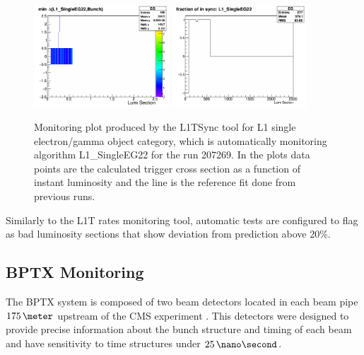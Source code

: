 \begin{figure}[!htb]
\centering
\includegraphics[width=0.45\textwidth]{Chapter03/L1TOnline/Images/L1TDQM_Online_Run207269_L1TSync_AlgoVsBunchStructure_EG.png}
\includegraphics[width=0.45\textwidth]{Chapter03/L1TOnline/Images/L1TDQM_Online_Run207269_L1TSync_Certification_EG.png}
\caption{Monitoring plot produced by the L1TSync tool for L1 single electron/gamma object category, which is
automatically monitoring algorithm L1\_SingleEG22 for the run 207269. In the plots data points are the calculated
trigger cross section as a function of instant luminosity and the line is the reference fit done from previous runs.}
\label{FIGURE:TechnicalWork_SyncMonitoring}
\end{figure}

Similarly to the \gls{L1T} rates monitoring tool, automatic tests are configured to flag as bad luminosity sections that show deviation from prediction above 20\%. 

\subsection{BPTX Monitoring}


The \acrfull{BPTX} system is composed of two beam detectors located in each beam pipe $175\,\meter$ upstream of the \gls{CMS} experiment \cite{ARTICLE:TheCMSExperiment}. This detectors were designed to provide precise information about the bunch structure and timing of each beam and have sensitivity to time structures under $25\,\nano\second$. 

